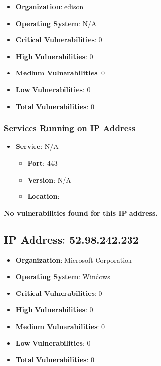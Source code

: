 \documentclass{article}
\begin{document}
\begin{itemize}
    \item \textbf{Organization}: edison
    \item \textbf{Operating System}:  N/A 
    \item \textbf{Critical Vulnerabilities}: 0
    \item \textbf{High Vulnerabilities}: 0
    \item \textbf{Medium Vulnerabilities}: 0
    \item \textbf{Low Vulnerabilities}: 0
    \item \textbf{Total Vulnerabilities}: 0
\end{itemize}

\subsubsection*{Services Running on IP Address}

\begin{itemize}
    
        \item \textbf{Service}: N/A
        \begin{itemize}
            \item \textbf{Port}: 443
            \item \textbf{Version}:  N/A 
            \item \textbf{Location}: \href{  }{  }
        \end{itemize}
    
\end{itemize}


\textbf{No vulnerabilities found for this IP address.}




\clearpage



\subsection*{IP Address: 52.98.242.232}

\begin{itemize}
    \item \textbf{Organization}: Microsoft Corporation
    \item \textbf{Operating System}:  Windows 
    \item \textbf{Critical Vulnerabilities}: 0
    \item \textbf{High Vulnerabilities}: 0
    \item \textbf{Medium Vulnerabilities}: 0
    \item \textbf{Low Vulnerabilities}: 0
    \item \textbf{Total Vulnerabilities}: 0
\end{itemize}
\end{document}
